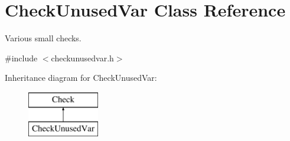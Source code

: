 \hypertarget{class_check_unused_var}{\section{Check\-Unused\-Var Class Reference}
\label{class_check_unused_var}
}


Various small checks.  




{\ttfamily \#include $<$checkunusedvar.\-h$>$}

Inheritance diagram for Check\-Unused\-Var\-:\begin{figure}[H]
\begin{center}
\leavevmode
\includegraphics[height=2.000000cm]{class_check_unused_var}
\end{center}
\end{figure}
